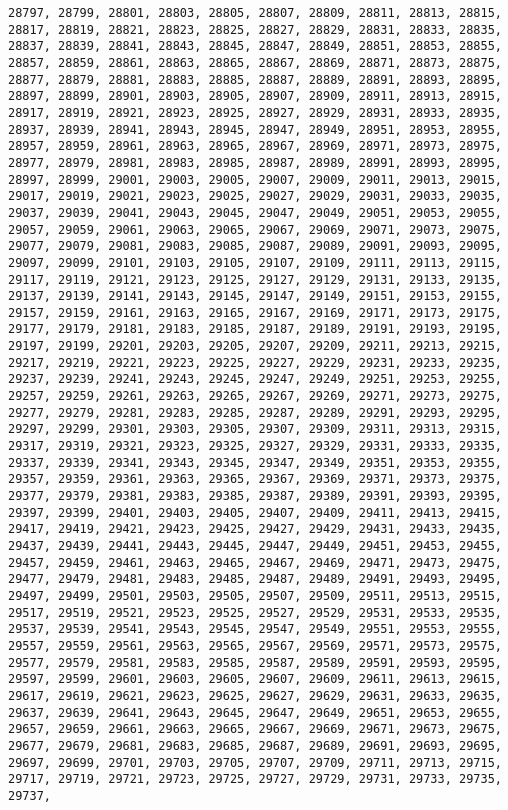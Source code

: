 \documentclass[11pt]{article}
\begin{document}
\begin{Verbatim}[commandchars=\\\{\}]
28797, 28799, 28801, 28803, 28805, 28807, 28809, 28811, 28813, 28815, 28817, 28819, 28821, 28823, 28825, 28827, 28829, 28831, 28833, 28835, 28837, 28839, 28841, 28843, 28845, 28847, 28849, 28851, 28853, 28855, 28857, 28859, 28861, 28863, 28865, 28867, 28869, 28871, 28873, 28875, 28877, 28879, 28881, 28883, 28885, 28887, 28889, 28891, 28893, 28895, 28897, 28899, 28901, 28903, 28905, 28907, 28909, 28911, 28913, 28915, 28917, 28919, 28921, 28923, 28925, 28927, 28929, 28931, 28933, 28935, 28937, 28939, 28941, 28943, 28945, 28947, 28949, 28951, 28953, 28955, 28957, 28959, 28961, 28963, 28965, 28967, 28969, 28971, 28973, 28975, 28977, 28979, 28981, 28983, 28985, 28987, 28989, 28991, 28993, 28995, 28997, 28999, 29001, 29003, 29005, 29007, 29009, 29011, 29013, 29015, 29017, 29019, 29021, 29023, 29025, 29027, 29029, 29031, 29033, 29035, 29037, 29039, 29041, 29043, 29045, 29047, 29049, 29051, 29053, 29055, 29057, 29059, 29061, 29063, 29065, 29067, 29069, 29071, 29073, 29075, 29077, 29079, 29081, 29083, 29085, 29087, 29089, 29091, 29093, 29095, 29097, 29099, 29101, 29103, 29105, 29107, 29109, 29111, 29113, 29115, 29117, 29119, 29121, 29123, 29125, 29127, 29129, 29131, 29133, 29135, 29137, 29139, 29141, 29143, 29145, 29147, 29149, 29151, 29153, 29155, 29157, 29159, 29161, 29163, 29165, 29167, 29169, 29171, 29173, 29175, 29177, 29179, 29181, 29183, 29185, 29187, 29189, 29191, 29193, 29195, 29197, 29199, 29201, 29203, 29205, 29207, 29209, 29211, 29213, 29215, 29217, 29219, 29221, 29223, 29225, 29227, 29229, 29231, 29233, 29235, 29237, 29239, 29241, 29243, 29245, 29247, 29249, 29251, 29253, 29255, 29257, 29259, 29261, 29263, 29265, 29267, 29269, 29271, 29273, 29275, 29277, 29279, 29281, 29283, 29285, 29287, 29289, 29291, 29293, 29295, 29297, 29299, 29301, 29303, 29305, 29307, 29309, 29311, 29313, 29315, 29317, 29319, 29321, 29323, 29325, 29327, 29329, 29331, 29333, 29335, 29337, 29339, 29341, 29343, 29345, 29347, 29349, 29351, 29353, 29355, 29357, 29359, 29361, 29363, 29365, 29367, 29369, 29371, 29373, 29375, 29377, 29379, 29381, 29383, 29385, 29387, 29389, 29391, 29393, 29395, 29397, 29399, 29401, 29403, 29405, 29407, 29409, 29411, 29413, 29415, 29417, 29419, 29421, 29423, 29425, 29427, 29429, 29431, 29433, 29435, 29437, 29439, 29441, 29443, 29445, 29447, 29449, 29451, 29453, 29455, 29457, 29459, 29461, 29463, 29465, 29467, 29469, 29471, 29473, 29475, 29477, 29479, 29481, 29483, 29485, 29487, 29489, 29491, 29493, 29495, 29497, 29499, 29501, 29503, 29505, 29507, 29509, 29511, 29513, 29515, 29517, 29519, 29521, 29523, 29525, 29527, 29529, 29531, 29533, 29535, 29537, 29539, 29541, 29543, 29545, 29547, 29549, 29551, 29553, 29555, 29557, 29559, 29561, 29563, 29565, 29567, 29569, 29571, 29573, 29575, 29577, 29579, 29581, 29583, 29585, 29587, 29589, 29591, 29593, 29595, 29597, 29599, 29601, 29603, 29605, 29607, 29609, 29611, 29613, 29615, 29617, 29619, 29621, 29623, 29625, 29627, 29629, 29631, 29633, 29635, 29637, 29639, 29641, 29643, 29645, 29647, 29649, 29651, 29653, 29655, 29657, 29659, 29661, 29663, 29665, 29667, 29669, 29671, 29673, 29675, 29677, 29679, 29681, 29683, 29685, 29687, 29689, 29691, 29693, 29695, 29697, 29699, 29701, 29703, 29705, 29707, 29709, 29711, 29713, 29715, 29717, 29719, 29721, 29723, 29725, 29727, 29729, 29731, 29733, 29735, 29737, 
\end{Verbatim}
\end{document}
